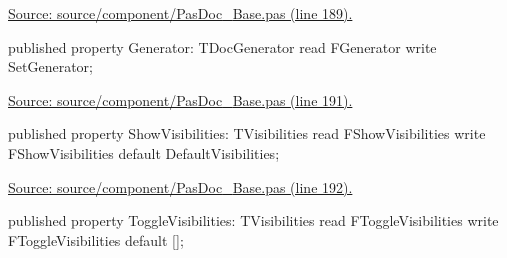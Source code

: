 \documentclass{report}
\newif\ifpdf
\begin{document}
\begin{list}{}
\begin{flushleft}
\ifpdf
\end{flushleft}
\fi


\par  \par
\href{https://github.com/pasdoc/pasdoc/blob/master/source/component/PasDoc_Base.pas#L189}{Source: source/component/PasDoc{\_}Base.pas (line 189).}\label{PasDoc_Base.TPasDoc-Generator}
\item[\textbf{Generator}\hfill]
\ifpdf
\begin{flushleft}
\fi
\begin{ttfamily}
published property Generator: TDocGenerator read FGenerator write SetGenerator;\end{ttfamily}

\ifpdf
\end{flushleft}
\fi


\par  \par
\href{https://github.com/pasdoc/pasdoc/blob/master/source/component/PasDoc_Base.pas#L191}{Source: source/component/PasDoc{\_}Base.pas (line 191).}\label{PasDoc_Base.TPasDoc-ShowVisibilities}
\item[\textbf{ShowVisibilities}\hfill]
\ifpdf
\begin{flushleft}
\fi
\begin{ttfamily}
published property ShowVisibilities: TVisibilities
      read FShowVisibilities write FShowVisibilities
      default DefaultVisibilities;\end{ttfamily}

\ifpdf
\end{flushleft}
\fi


\par  \par
\href{https://github.com/pasdoc/pasdoc/blob/master/source/component/PasDoc_Base.pas#L192}{Source: source/component/PasDoc{\_}Base.pas (line 192).}\label{PasDoc_Base.TPasDoc-ToggleVisibilities}
\item[\textbf{ToggleVisibilities}\hfill]
\ifpdf
\begin{flushleft}
\fi
\begin{ttfamily}
published property ToggleVisibilities: TVisibilities
      read FToggleVisibilities write FToggleVisibilities default [];\end{ttfamily}

\ifpdf
\end{flushleft}
\fi



\end{list}
\end{document}
